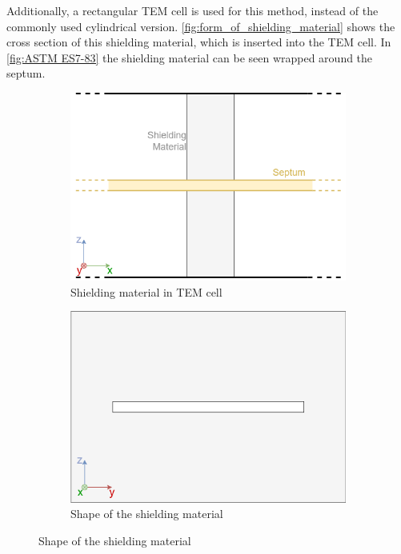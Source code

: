 Additionally, a rectangular TEM cell is used for this method, instead of the commonly used cylindrical version. \autoref{fig:form_of_shielding_material} shows the cross section of this shielding material, which is inserted into the TEM cell. In \autoref{fig:ASTM ES7-83} the shielding material can be seen wrapped around the septum. 

\begin{figure}[h]
    \centering
    \begin{subfigure}[h]{0.49\textwidth}
        \centering
        \includegraphics[width=\textwidth]{Documentation//content//10_theory//img/ASTM ES7-83.png}
        \caption{Shielding material in TEM cell}
        \label{fig:ASTM ES7-83}
    \end{subfigure}%
    \hfill
    \begin{subfigure}[h]{0.49\textwidth}
        \centering
        \includegraphics[width=\textwidth]{Documentation//content//10_theory/img/form_of_shielding_material.png}
        \caption{Shape of the shielding material}
        \label{fig:form_of_shielding_material}
    \end{subfigure}
    \label{fig:subfigures}
\end{figure}

